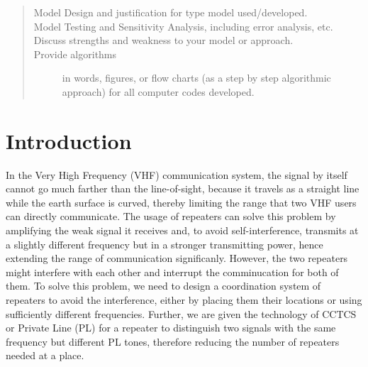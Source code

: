 \documentclass{icmmcm}
\begin{document}
\begin{summary}
\begin{quotation}
\begin{description}
\item[Model Design and justification for type model used/developed.]

\item[Model Testing and Sensitivity Analysis, including error
  analysis, etc.]

\item[Discuss strengths and weakness to your model or approach.]

\item[Provide algorithms] in words, figures, or flow charts (as a step
  by step algorithmic approach) for all computer codes developed.
\end{description}
 \citep{comap-mcm-rules}
\end{quotation}

\end{summary}
 


\maketitle
\tableofcontents

\listoffigures
\listoftables  
 

\section{Introduction}%
\label{sec:introduction}


In the Very High Frequency (VHF) communication system, the signal by itself cannot go much farther than the line-of-sight, because it travels as a straight line while the earth surface is curved, thereby limiting the range that two VHF users can directly communicate. The usage of repeaters can solve this problem by amplifying the weak signal it receives and, to avoid self-interference, transmits at a slightly different frequency but in a stronger transmitting power, hence extending the range of communication significanly. However, the two repeaters might interfere with each other and interrupt the comminucation for both of them. To solve this problem, we need to design a coordination system of repeaters to avoid the interference, either by placing them their locations or using sufficiently different frequencies. Further, we are given the technology of CCTCS or Private Line (PL) for a repeater to distinguish two signals with the same frequency but different PL tones, therefore reducing the number of repeaters needed at a place.
\end{document}
